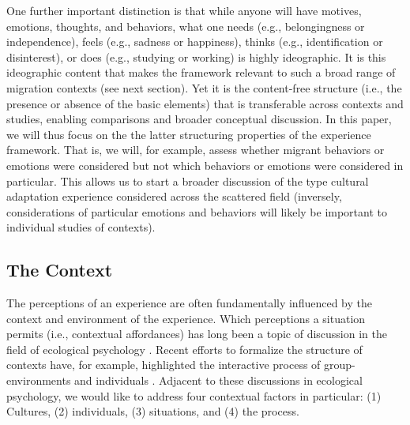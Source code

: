 \documentclass[man, 12pt, a4paper]{apa7}
\begin{document}
One further important distinction is that while anyone will have motives, emotions, thoughts, and behaviors, what one needs (e.g., belongingness or independence), feels (e.g., sadness or happiness), thinks (e.g., identification or disinterest), or does (e.g., studying or working) is highly ideographic. It is this ideographic content that makes the framework relevant to such a broad range of migration contexts (see next section). Yet it is the content-free structure (i.e., the presence or absence of the basic elements) that is transferable across contexts and studies, enabling comparisons and broader conceptual discussion. In this paper, we will thus focus on the the latter structuring properties of the experience framework. That is, we will, for example, assess whether migrant behaviors or emotions were considered but not which behaviors or emotions were considered in particular. This allows us to start a broader discussion of the type cultural adaptation experience considered across the scattered field (inversely, considerations of particular emotions and behaviors will likely be important to individual studies of contexts).

\subsection{The Context}
The perceptions of an experience are often fundamentally influenced by the context and environment of the experience. Which perceptions a situation permits (i.e., contextual affordances) has long been a topic of discussion in the field of ecological psychology \citep[e.g.,][]{Cantor1994}. Recent efforts to formalize the structure of contexts have, for example, highlighted the interactive process of group-environments and individuals \citep[e.g.,][]{Young2002}.
Adjacent to these discussions in ecological psychology, we would like to address four contextual factors in particular: (1) Cultures, (2) individuals, (3) situations, and (4) the process.
\end{document}
